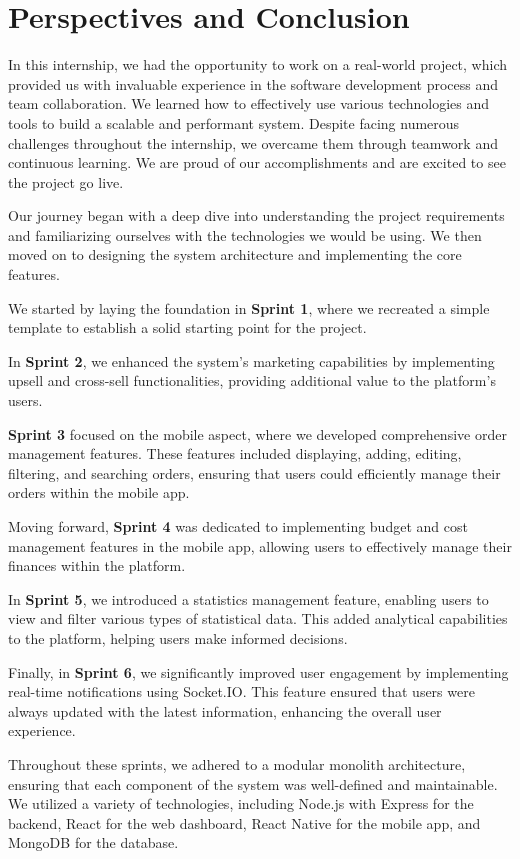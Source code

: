 \chapter{Perspectives and Conclusion}

In this internship, we had the opportunity to work on a real-world project, which provided us with invaluable experience in the software development process and team collaboration. We learned how to effectively use various technologies and tools to build a scalable and performant system. Despite facing numerous challenges throughout the internship, we overcame them through teamwork and continuous learning. We are proud of our accomplishments and are excited to see the project go live.

Our journey began with a deep dive into understanding the project requirements and familiarizing ourselves with the technologies we would be using. We then moved on to designing the system architecture and implementing the core features.

We started by laying the foundation in \textbf{Sprint 1}, where we recreated a simple template to establish a solid starting point for the project.

In \textbf{Sprint 2}, we enhanced the system's marketing capabilities by implementing upsell and cross-sell functionalities, providing additional value to the platform’s users.

\textbf{Sprint 3} focused on the mobile aspect, where we developed comprehensive order management features. These features included displaying, adding, editing, filtering, and searching orders, ensuring that users could efficiently manage their orders within the mobile app.

Moving forward, \textbf{Sprint 4} was dedicated to implementing budget and cost management features in the mobile app, allowing users to effectively manage their finances within the platform.

In \textbf{Sprint 5}, we introduced a statistics management feature, enabling users to view and filter various types of statistical data. This added analytical capabilities to the platform, helping users make informed decisions.

Finally, in \textbf{Sprint 6}, we significantly improved user engagement by implementing real-time notifications using Socket.IO. This feature ensured that users were always updated with the latest information, enhancing the overall user experience.

Throughout these sprints, we adhered to a modular monolith architecture, ensuring that each component of the system was well-defined and maintainable. We utilized a variety of technologies, including Node.js with Express for the backend, React for the web dashboard, React Native for the mobile app, and MongoDB for the database.

